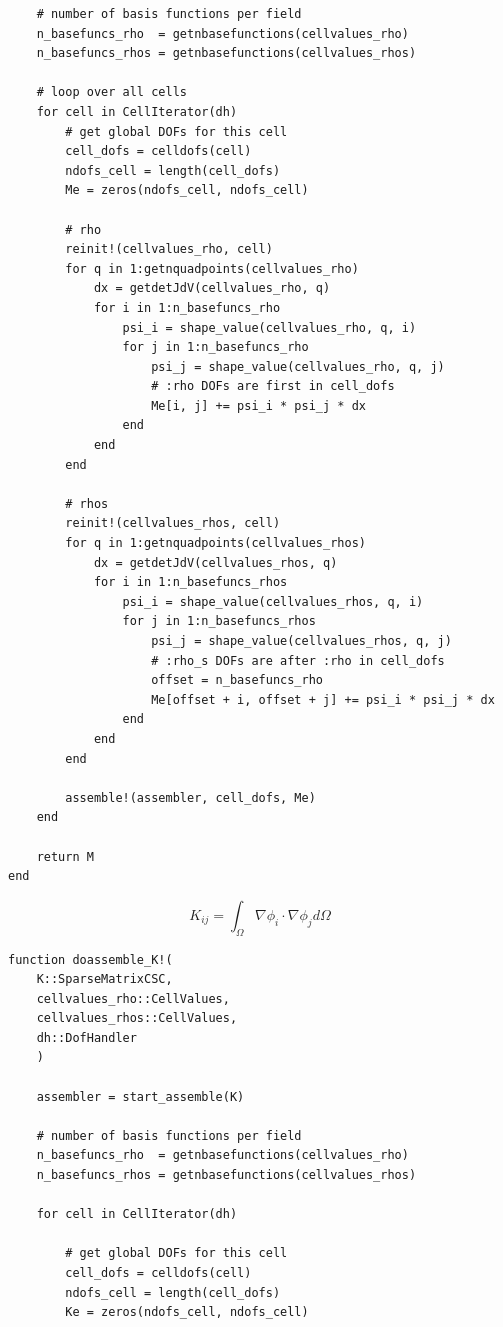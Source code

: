 \begin{appendices}
\begin{lstlisting}
    # number of basis functions per field
    n_basefuncs_rho  = getnbasefunctions(cellvalues_rho)
    n_basefuncs_rhos = getnbasefunctions(cellvalues_rhos)

    # loop over all cells
    for cell in CellIterator(dh)
        # get global DOFs for this cell
        cell_dofs = celldofs(cell)
        ndofs_cell = length(cell_dofs)
        Me = zeros(ndofs_cell, ndofs_cell)

        # rho
        reinit!(cellvalues_rho, cell)
        for q in 1:getnquadpoints(cellvalues_rho)
            dx = getdetJdV(cellvalues_rho, q)
            for i in 1:n_basefuncs_rho
                psi_i = shape_value(cellvalues_rho, q, i)
                for j in 1:n_basefuncs_rho
                    psi_j = shape_value(cellvalues_rho, q, j)
                    # :rho DOFs are first in cell_dofs
                    Me[i, j] += psi_i * psi_j * dx
                end
            end
        end

        # rhos
        reinit!(cellvalues_rhos, cell)
        for q in 1:getnquadpoints(cellvalues_rhos)
            dx = getdetJdV(cellvalues_rhos, q)
            for i in 1:n_basefuncs_rhos
                psi_i = shape_value(cellvalues_rhos, q, i)
                for j in 1:n_basefuncs_rhos
                    psi_j = shape_value(cellvalues_rhos, q, j)
                    # :rho_s DOFs are after :rho in cell_dofs
                    offset = n_basefuncs_rho
                    Me[offset + i, offset + j] += psi_i * psi_j * dx
                end
            end
        end

        assemble!(assembler, cell_dofs, Me)
    end

    return M
end
\end{lstlisting}
\begin{equation}
    K_{ij} = \int_{\Omega} \nabla \phi_i \cdot \nabla \phi_j d\Omega
\end{equation}
\begin{lstlisting}
function doassemble_K!(
    K::SparseMatrixCSC, 
    cellvalues_rho::CellValues, 
    cellvalues_rhos::CellValues, 
    dh::DofHandler
    )

    assembler = start_assemble(K)

    # number of basis functions per field
    n_basefuncs_rho  = getnbasefunctions(cellvalues_rho)
    n_basefuncs_rhos = getnbasefunctions(cellvalues_rhos)

    for cell in CellIterator(dh)

        # get global DOFs for this cell
        cell_dofs = celldofs(cell)
        ndofs_cell = length(cell_dofs)
        Ke = zeros(ndofs_cell, ndofs_cell)


\end{lstlisting}
\end{appendices}
